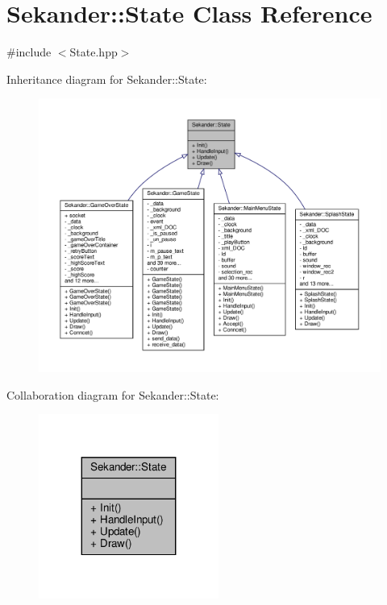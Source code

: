 \hypertarget{classSekander_1_1State}{}\section{Sekander\+:\+:State Class Reference}
\label{classSekander_1_1State}


{\ttfamily \#include $<$State.\+hpp$>$}



Inheritance diagram for Sekander\+:\+:State\+:
\nopagebreak
\begin{figure}[H]
\begin{center}
\leavevmode
\includegraphics[width=350pt]{classSekander_1_1State__inherit__graph}
\end{center}
\end{figure}


Collaboration diagram for Sekander\+:\+:State\+:
\nopagebreak
\begin{figure}[H]
\begin{center}
\leavevmode
\includegraphics[width=167pt]{classSekander_1_1State__coll__graph}
\end{center}
\end{figure}
